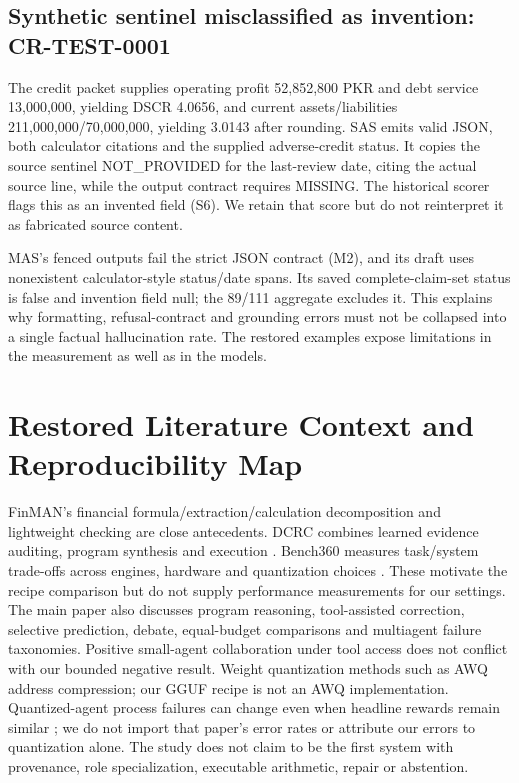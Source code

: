 \subsection{Synthetic sentinel misclassified as invention: CR-TEST-0001}
The credit packet supplies operating profit 52,852,800 PKR and debt service 13,000,000, yielding DSCR 4.0656, and current assets/liabilities 211,000,000/70,000,000, yielding 3.0143 after rounding. SAS emits valid JSON, both calculator citations and the supplied adverse-credit status. It copies the source sentinel NOT\_PROVIDED for the last-review date, citing the actual source line, while the output contract requires MISSING. The historical scorer flags this as an invented field (S6). We retain that score but do not reinterpret it as fabricated source content.

MAS's fenced outputs fail the strict JSON contract (M2), and its draft uses nonexistent calculator-style status/date spans. Its saved complete-claim-set status is false and invention field null; the 89/111 aggregate excludes it. This explains why formatting, refusal-contract and grounding errors must not be collapsed into a single factual hallucination rate. The restored examples expose limitations in the measurement as well as in the models.

\section{Restored Literature Context and Reproducibility Map}\label{sec:lit-restored}
FinMAN's financial formula/extraction/calculation decomposition and lightweight checking \citep{finman} are close antecedents. DCRC combines learned evidence auditing, program synthesis and execution \citep{dcrc}. Bench360 measures task/system trade-offs across engines, hardware and quantization choices \citep{bench360}. These motivate the recipe comparison but do not supply performance measurements for our settings. The main paper also discusses program reasoning, tool-assisted correction, selective prediction, debate, equal-budget comparisons and multiagent failure taxonomies. Positive small-agent collaboration under tool access \citep{smallagents} does not conflict with our bounded negative result. Weight quantization methods such as AWQ \citep{awq} address compression; our GGUF recipe is not an AWQ implementation. Quantized-agent process failures can change even when headline rewards remain similar \citep{quantfail}; we do not import that paper's error rates or attribute our errors to quantization alone. The study does not claim to be the first system with provenance, role specialization, executable arithmetic, repair or abstention.

